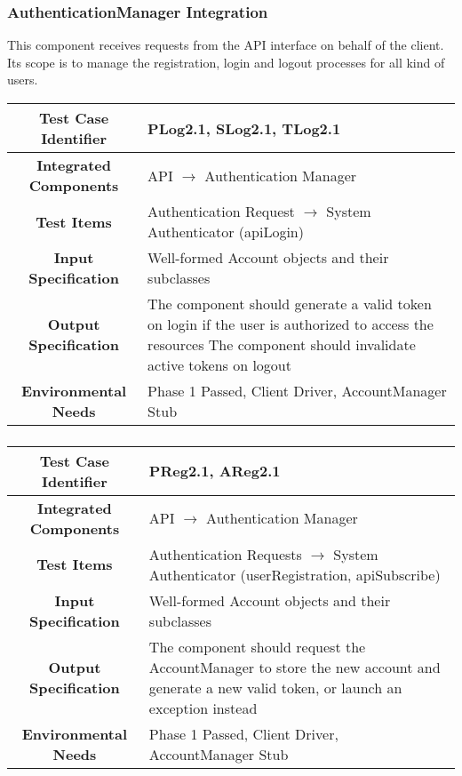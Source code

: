 \documentclass[11pt, a4paper,titlepage]{article}
\begin{document}
	 \subsubsection{AuthenticationManager Integration}
	 This component receives requests from the API interface on behalf of the client. Its scope is to manage the registration, login and logout processes for all kind of users. 
	 \newline
	 \begin{tabularx}{\textwidth}{| c|X|}
	 	\hline \textbf{Test Case Identifier} & \label{PLog2.1}PLog2.1, \label{SLog2.1}SLog2.1, \label{TLog2.1}TLog2.1 \\
	 	\hline \textbf{Integrated Components} &  API $\rightarrow $ Authentication Manager\\
	 	\hline \textbf{Test Items} &  Authentication Request $\rightarrow $ System Authenticator (apiLogin)\\
	 	\hline \textbf{Input Specification} &  Well-formed Account objects and their subclasses\\
	 	\hline \textbf{Output Specification} & The component should generate a valid token on login if the user is authorized to access the resources \newline
	 	The component should invalidate active tokens on logout \\
	 	\hline \textbf{Environmental Needs} &  Phase 1 Passed, Client Driver, AccountManager Stub \\
	 	\hline
	 \end{tabularx}
	 \newline
	 \subsubsection{}
	 \begin{tabularx}{\textwidth}{| c|X|}
	 	\hline \textbf{Test Case Identifier} &  \label{PReg2.1}PReg2.1, \label{AReg2.1}AReg2.1 \\
	 	\hline \textbf{Integrated Components} & API $\rightarrow $ Authentication Manager \\
	 	\hline \textbf{Test Items} &  Authentication Requests $\rightarrow $ System Authenticator (userRegistration, apiSubscribe)\\
	 	\hline \textbf{Input Specification} & Well-formed Account objects and their subclasses  \\
	 	\hline \textbf{Output Specification} & The component should request the AccountManager to store the new account and generate a new valid token, or launch an exception instead \\
	 	\hline \textbf{Environmental Needs} & Phase 1 Passed, Client Driver, AccountManager Stub \\
	 	\hline
	 \end{tabularx}
	 \newline
	 \newpage
\end{document}

